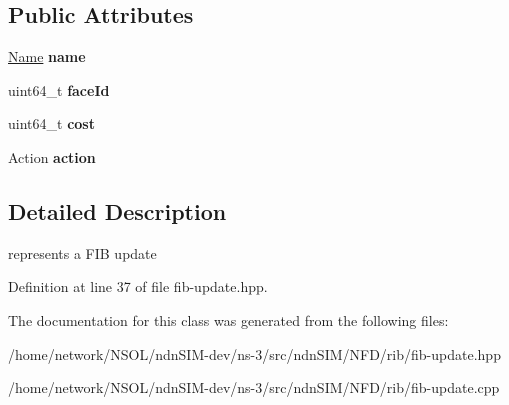 \subsection*{Public Attributes}
\begin{DoxyCompactItemize}
\item 
\hyperlink{classndn_1_1Name}{Name} {\bfseries name}\hypertarget{classnfd_1_1rib_1_1FibUpdate_a4d21919c8080fee3d88a317a0419659a}{}\label{classnfd_1_1rib_1_1FibUpdate_a4d21919c8080fee3d88a317a0419659a}

\item 
uint64\+\_\+t {\bfseries face\+Id}\hypertarget{classnfd_1_1rib_1_1FibUpdate_a0bbd858e23e3e8663be021781009f0e3}{}\label{classnfd_1_1rib_1_1FibUpdate_a0bbd858e23e3e8663be021781009f0e3}

\item 
uint64\+\_\+t {\bfseries cost}\hypertarget{classnfd_1_1rib_1_1FibUpdate_a1de8298d913e8f4ac582b036ddd0e382}{}\label{classnfd_1_1rib_1_1FibUpdate_a1de8298d913e8f4ac582b036ddd0e382}

\item 
Action {\bfseries action}\hypertarget{classnfd_1_1rib_1_1FibUpdate_a454b27ce6a46f55345cf2ebdf7330469}{}\label{classnfd_1_1rib_1_1FibUpdate_a454b27ce6a46f55345cf2ebdf7330469}

\end{DoxyCompactItemize}


\subsection{Detailed Description}
represents a F\+IB update 

Definition at line 37 of file fib-\/update.\+hpp.



The documentation for this class was generated from the following files\+:\begin{DoxyCompactItemize}
\item 
/home/network/\+N\+S\+O\+L/ndn\+S\+I\+M-\/dev/ns-\/3/src/ndn\+S\+I\+M/\+N\+F\+D/rib/fib-\/update.\+hpp\item 
/home/network/\+N\+S\+O\+L/ndn\+S\+I\+M-\/dev/ns-\/3/src/ndn\+S\+I\+M/\+N\+F\+D/rib/fib-\/update.\+cpp\end{DoxyCompactItemize}
